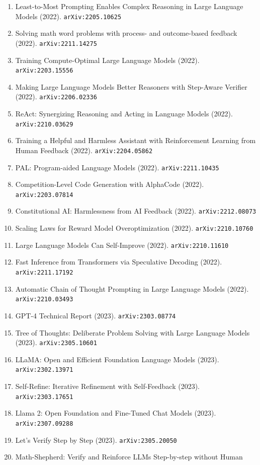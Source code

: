 \documentclass[11pt]{article}
\begin{document}
\begin{enumerate}
  \item Least-to-Most Prompting Enables Complex Reasoning in Large Language
  Models (2022). \texttt{arXiv:2205.10625}
  \item Solving math word problems with process- and outcome-based feedback (2022). \texttt{arXiv:2211.14275}
  \item Training Compute-Optimal Large Language Models (2022). \texttt{arXiv:2203.15556}
  \item Making Large Language Models Better Reasoners with Step-Aware Verifier (2022). \texttt{arXiv:2206.02336}
  \item ReAct: Synergizing Reasoning and Acting in Language Models (2022). \texttt{arXiv:2210.03629}
  \item Training a Helpful and Harmless Assistant with Reinforcement Learning
  from Human Feedback (2022). \texttt{arXiv:2204.05862}
  \item PAL: Program-aided Language Models (2022). \texttt{arXiv:2211.10435}
  \item Competition-Level Code Generation with AlphaCode (2022). \texttt{arXiv:2203.07814}
  \item Constitutional AI: Harmlessness from AI Feedback (2022). \texttt{arXiv:2212.08073}
  \item Scaling Laws for Reward Model Overoptimization (2022). \texttt{arXiv:2210.10760}
  \item Large Language Models Can Self-Improve (2022). \texttt{arXiv:2210.11610}
  \item Fast Inference from Transformers via Speculative Decoding (2022). \texttt{arXiv:2211.17192}
  \item Automatic Chain of Thought Prompting in Large Language Models (2022). \texttt{arXiv:2210.03493}
  \item GPT-4 Technical Report (2023). \texttt{arXiv:2303.08774}
  \item Tree of Thoughts: Deliberate Problem Solving with Large Language Models (2023). \texttt{arXiv:2305.10601}
  \item LLaMA: Open and Efficient Foundation Language Models (2023). \texttt{arXiv:2302.13971}
  \item Self-Refine: Iterative Refinement with Self-Feedback (2023). \texttt{arXiv:2303.17651}
  \item Llama 2: Open Foundation and Fine-Tuned Chat Models (2023). \texttt{arXiv:2307.09288}
  \item Let's Verify Step by Step (2023). \texttt{arXiv:2305.20050}
  \item Math-Shepherd: Verify and Reinforce LLMs Step-by-step without Human

\end{enumerate}
\end{document}
